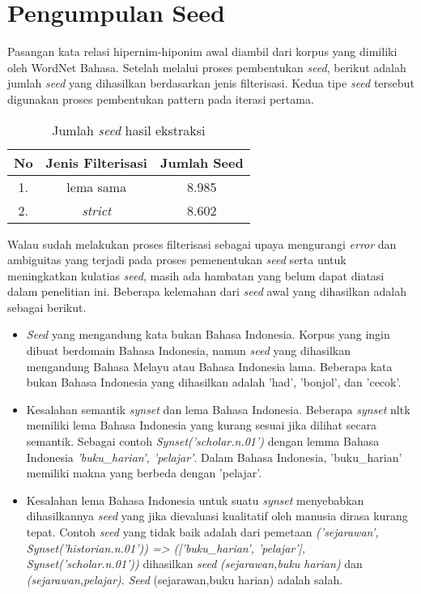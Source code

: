 \section{Pengumpulan Seed}
\label{bab-pengumpulanseed}
Pasangan kata relasi hipernim-hiponim awal diambil dari korpus yang dimiliki oleh WordNet Bahasa. Setelah melalui proses pembentukan \textit{seed}, berikut adalah jumlah \textit{seed} yang dihasilkan berdasarkan jenis filterisasi. Kedua tipe \textit{seed} tersebut digunakan proses pembentukan pattern pada iterasi pertama. 

\begin{table}
  \centering
    \caption{Jumlah \textit{seed} hasil ekstraksi}
      \label{table:jumlahSeed}
      \begin{tabular}{|c|c|c|}
        \hline
          No & Jenis Filterisasi & Jumlah Seed \\ \hline
          1. & lema sama         & 8.985       \\ \hline
          2. & \textit{strict}   & 8.602       \\ \hline
    \end{tabular}
\end{table}

Walau sudah melakukan proses filterisasi sebagai upaya mengurangi \textit{error} dan ambiguitas yang terjadi pada proses pemenentukan \textit{seed} serta untuk meningkatkan kulatias \textit{seed}, masih ada hambatan yang belum dapat diatasi dalam penelitian ini. Beberapa kelemahan dari \textit{seed} awal yang dihasilkan adalah sebagai berikut.

\begin{itemize}
  \item \textit{Seed} yang mengandung kata bukan Bahasa Indonesia. Korpus yang ingin dibuat berdomain Bahasa Indonesia, namun \textit{seed} yang dihasilkan mengandung Bahasa Melayu atau Bahasa Indonesia lama. Beberapa kata bukan Bahasa Indonesia yang dihasilkan adalah 'had', 'bonjol', dan 'cecok'.
  \item Kesalahan semantik \textit{synset} dan lema Bahasa Indonesia. Beberapa \textit{synset} nltk memiliki lema Bahasa Indonesia yang kurang sesuai jika dilihat secara semantik. Sebagai contoh \textit{Synset('scholar.n.01')} dengan lemma Bahasa Indonesia \textit{{'buku\_harian', 'pelajar'}}. Dalam Bahasa Indonesia, 'buku\_harian' memiliki makna yang berbeda dengan 'pelajar'.
  \item Kesalahan lema Bahasa Indonesia untuk suatu \textit{synset} menyebabkan dihasilkannya \textit{seed} yang jika dievaluasi kualitatif oleh manusia dirasa kurang tepat. Contoh \textit{seed} yang tidak baik adalah dari pemetaan \textit{('sejarawan', Synset('historian.n.01')) => (['buku\_harian', 'pelajar'], Synset('scholar.n.01'))} dihasilkan \textit{seed} \textit{(sejarawan,buku harian)} dan \textit{(sejarawan,pelajar)}. \textit{Seed} (sejarawan,buku harian) adalah salah.
\end{itemize}

